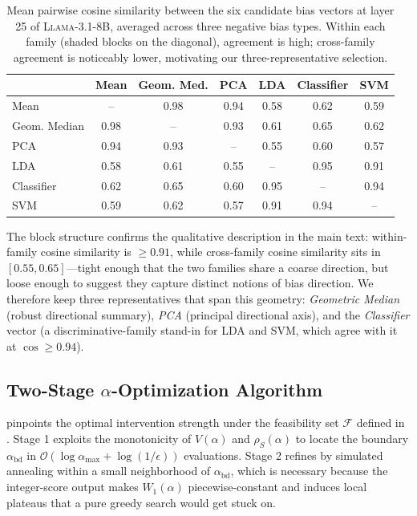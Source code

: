 \documentclass[11pt]{article}
\let\Cref\crtCref
\begin{document}
\begin{table}[t]
\centering
\small
\caption{Mean pairwise cosine similarity between the six candidate bias vectors at layer 25 of \textsc{Llama-3.1-8B}, averaged across three negative bias types. Within each family (shaded blocks on the diagonal), agreement is high; cross-family agreement is noticeably lower, motivating our three-representative selection.}
\label{tab:vector_cosine}
\setlength{\tabcolsep}{6pt}
\begin{tabular}{l cccccc}
\toprule
 & Mean & Geom. Med. & PCA & LDA & Classifier & SVM \\
\midrule
Mean & -- & 0.98 & 0.94 & 0.58 & 0.62 & 0.59 \\
Geom. Median & 0.98 & -- & 0.93 & 0.61 & 0.65 & 0.62 \\
PCA & 0.94 & 0.93 & -- & 0.55 & 0.60 & 0.57 \\
\midrule
LDA & 0.58 & 0.61 & 0.55 & -- & 0.95 & 0.91 \\
Classifier & 0.62 & 0.65 & 0.60 & 0.95 & -- & 0.94 \\
SVM & 0.59 & 0.62 & 0.57 & 0.91 & 0.94 & -- \\
\bottomrule
\end{tabular}
\end{table}

The block structure confirms the qualitative description in the main text: within-family cosine similarity is $\geq 0.91$, while cross-family cosine similarity sits in $[0.55, 0.65]$---tight enough that the two families share a coarse direction, but loose enough to suggest they capture distinct notions of bias direction. We therefore keep three representatives that span this geometry: \emph{Geometric Median} (robust directional summary), \emph{PCA} (principal directional axis), and the \emph{Classifier} vector (a discriminative-family stand-in for LDA and SVM, which agree with it at $\cos \geq 0.94$).

\subsection{Two-Stage $\alpha$-Optimization Algorithm}
\label{app:alpha_algo}

\Cref{alg:alpha_search} pinpoints the optimal intervention strength under the feasibility set $\mathcal{F}$ defined in \Cref{eq:alpha_obj}. Stage 1 exploits the monotonicity of $V(\alpha)$ and $\rho_S(\alpha)$ to locate the boundary $\alpha_{\text{bd}}$ in $\mathcal{O}(\log \alpha_{\max} + \log(1/\epsilon))$ evaluations. Stage 2 refines by simulated annealing within a small neighborhood of $\alpha_{\text{bd}}$, which is necessary because the integer-score output makes $W_1(\alpha)$ piecewise-constant and induces local plateaus that a pure greedy search would get stuck on.
\end{document}
